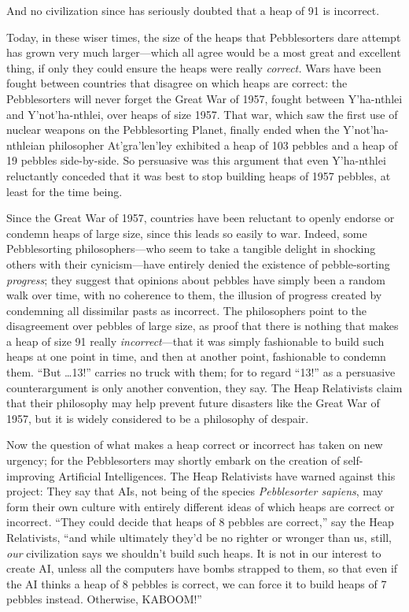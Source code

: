 {
 And no civilization since has seriously doubted that a heap of 91
is incorrect.}

{
 Today, in these wiser times, the size of the heaps that
Pebblesorters dare attempt has grown very much larger---which all agree
would be a most great and excellent thing, if only they could ensure
the heaps were really \textit{correct.} Wars have been fought between
countries that disagree on which heaps are correct: the Pebblesorters
will never forget the Great War of 1957, fought between
Y'ha-nthlei and
Y'not'ha-nthlei, over heaps of size
1957. That war, which saw the first use of nuclear weapons on the
Pebblesorting Planet, finally ended when the
Y'not'ha-nthleian philosopher
At'gra'len'ley
exhibited a heap of 103 pebbles and a heap of 19 pebbles side-by-side.
So persuasive was this argument that even Y'ha-nthlei
reluctantly conceded that it was best to stop building heaps of 1957
pebbles, at least for the time being.}

{
 Since the Great War of 1957, countries have been reluctant to
openly endorse or condemn heaps of large size, since this leads so
easily to war. Indeed, some Pebblesorting philosophers---who seem to
take a tangible delight in shocking others with their cynicism---have
entirely denied the existence of pebble-sorting \textit{progress}; they
suggest that opinions about pebbles have simply been a random walk over
time, with no coherence to them, the illusion of progress created by
condemning all dissimilar pasts as incorrect. The philosophers point to
the disagreement over pebbles of large size, as proof that there is
nothing that makes a heap of size 91 really \textit{incorrect}{}---that
it was simply fashionable to build such heaps at one point in time, and
then at another point, fashionable to condemn them.
``But \ldots 13!'' carries no truck
with them; for to regard ``13!'' as
a persuasive counterargument is only another convention, they say. The
Heap Relativists claim that their philosophy may help prevent future
disasters like the Great War of 1957, but it is widely considered to be
a philosophy of despair.}

{
 Now the question of what makes a heap correct or incorrect has
taken on new urgency; for the Pebblesorters may shortly embark on the
creation of self-improving Artificial Intelligences. The Heap
Relativists have warned against this project: They say that AIs, not
being of the species \textit{Pebblesorter sapiens}, may form their own
culture with entirely different ideas of which heaps are correct or
incorrect. ``They could decide that heaps of 8 pebbles
are correct,'' say the Heap Relativists,
``and while ultimately they'd be no
righter or wronger than us, still, \textit{our} civilization says we
shouldn't build such heaps. It is not in our interest
to create AI, unless all the computers have bombs strapped to them, so
that even if the AI thinks a heap of 8 pebbles is correct, we can force
it to build heaps of 7 pebbles instead. Otherwise,
KABOOM!''}

